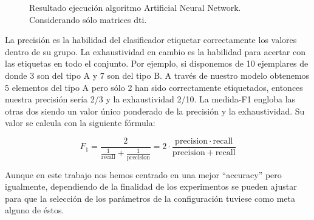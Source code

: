 \begin{figure}[H]
\centering
{}
\caption{Resultado ejecución algoritmo Artificial Neural Network. Considerando sólo matrices \gls{dti}.}
\label{figure:anndti}
\end{figure}

La precisión es la habilidad del clasificador etiquetar correctamente los valores dentro de su grupo. La exhaustividad en cambio es la habilidad para acertar con las etiquetas en todo el conjunto. Por ejemplo, si disponemos de 10 ejemplares de donde 3 son del tipo A y 7 son del tipo B. A través de nuestro modelo obtenemos 5 elementos del tipo A pero sólo 2 han sido correctamente etiquetados, entonces nuestra precisión sería 2/3 y la exhaustividad 2/10. La medida-F1 engloba las otras dos siendo un valor único ponderado de la precisión y la exhaustividad. Su valor se calcula con la siguiente fórmula: 

$$F_1 = \frac{2}{\tfrac{1}{\mathrm{recall}} + \tfrac{1}{\mathrm{precision}}} = 2 \cdot \frac{\mathrm{precision} \cdot \mathrm{recall}}{\mathrm{precision} + \mathrm{recall}}$$

Aunque en este trabajo nos hemos centrado en una mejor ``accuracy'' pero igualmente, dependiendo de la finalidad de los experimentos se pueden ajustar para que la selección de los parámetros de la configuración tuviese como meta alguno de éstos.
